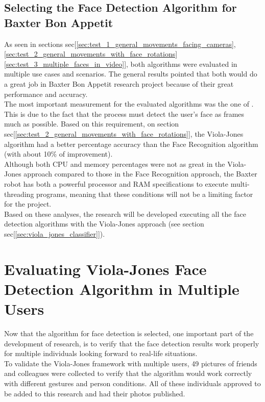 \documentclass[11pt]{report} %
\begin{document}
\subsection{Selecting the Face Detection Algorithm for Baxter Bon Appetit}

As seen in sections sec[\ref{sec:test_1_general_movements_facing_cameras}, \ref{sec:test_2_general_movements_with_face_rotations} \ref{sec:test_3_multiple_faces_in_video}], both algorithms were evaluated in multiple use cases and scenarios. The general results pointed that both would do a great job in Baxter Bon Appetit research project because of their great performance and accuracy.\\

The most important measurement for the evaluated algorithms was the one of . This is due to the fact that the process must detect the user's face as frames much as possible. Based on this requirement, on section sec[\ref{sec:test_2_general_movements_with_face_rotations}], the Viola-Jones algorithm had a better percentage accuracy than the Face Recognition algorithm (with about 10\% of improvement).\\

Although both CPU and memory percentages were not as great in the Viola-Jones approach compared to those in the Face Recognition approach, the Baxter robot has both a powerful processor and RAM specifications to execute multi-threading programs, meaning that these conditions will not be a limiting factor for the project.\\

Based on these analyses, the research will be developed executing all the face detection algorithms with the Viola-Jones approach (see section sec[\ref{sec:viola_jones_classifier}]).\\


\section{Evaluating Viola-Jones Face Detection Algorithm in Multiple Users}

Now that the algorithm for face detection is selected, one important part of the development of  research, is to verify that the face detection results work properly for multiple individuals looking forward to real-life situations.\\

To validate the Viola-Jones framework with multiple users, 49 pictures of friends and colleagues were collected to verify that the algorithm would work correctly with different gestures and person conditions. All of these individuals approved to be added to this research and had their photos published.\\
\end{document}
